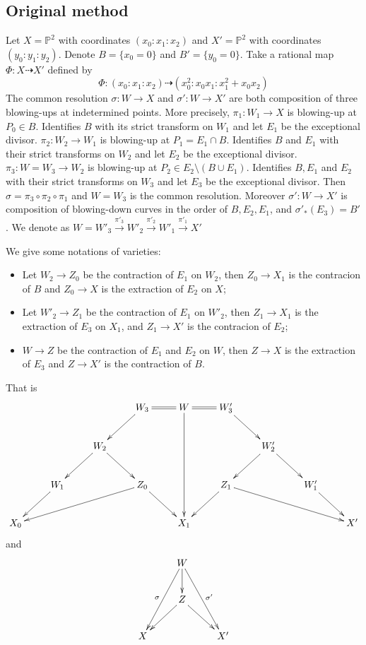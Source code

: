 \documentclass[11pt]{amsart}
\numberwithin{equation}{section}
\begin{document}
\subsection{Original method}\label{example1}
Let $ X=\mathbb{P}^2 $ with coordinates $ (x_0:x_1:x_2) $ and $ X'=\mathbb{P}^2 $ with coordinates $ (y_0:y_1:y_2) $.
Denote $ B=\{x_0=0\} $ and $B'=\{y_{0}=0\} $.
Take a rational map $ \Phi:X\dashrightarrow X' $ defined by 
\[ \Phi:(x_0:x_1:x_2)\dashrightarrow (x_0^2:x_0x_1:x_1^2+x_0x_2) \]
The common resolution $\sigma:W\to X$ and $\sigma':W\to X'$ are both composition of three blowing-ups at indetermined points.
More precisely, $\pi_{1}:W_{1}\to X$ is blowing-up at $P_{0} \in B$. Identifies $B$ with its strict transform on $W_{1}$ and let $E_{1}$ be the exceptional divisor.
$\pi_{2}:W_{2}\to W_{1}$ is blowing-up at $P_{1}=E_{1} \cap B$. Identifies  $B$ and $E_{1}$ with their strict transforms on $W_{2}$ and let $E_{2}$ be the exceptional divisor.
$\pi_{3}:W=W_{3}\to W_{2}$ is blowing-up at $P_{2} \in E_{2} \setminus (B\cup E_{1})$. Identifies  $B, E_{1}$ and $E_{2}$ with their strict transforms   on $W_{3}$ and let $E_{3}$ be the exceptional divisor.
Then $ \sigma=\pi_{3}\circ \pi_{2} \circ \pi_{1} $ and $ W=W_3 $ is the common resolution. Moreover $ \sigma':W\to X' $ is composition of blowing-down curves in the order of $ B,E_2,E_1 $, and $\sigma'_*(E_{3})=B'$. We denote as $W=W'_{3}\xrightarrow{\pi'_{3}} W'_{2}\xrightarrow{\pi'_{2}} W'_{1} \xrightarrow{\pi'_{1}} X'$

We give some notations of varieties:
\begin{itemize}
  \item Let $W_{2}\to Z_{0}$ be the contraction of $E_{1}$ on $W_{2}$, then $Z_{0} \to X_{1}$ is the contracion of $B$  and $Z_{0}\to X$ is the extraction of $E_{2}$ on $X$;
 \item Let $W'_{2}\to Z_{1}$ be the contraction of $E_{1}$ on $W'_{2}$, then $Z_{1} \to X_{1}$ is the extraction of $E_{3}$ on $X_{1}$, and $Z_{1}\to X'$ is the contracion of $E_{2}$;
 \item $W\to Z$ be the contraction of $E_{1}$ and $E_{2}$ on $W$, then $Z\to X$ is the extraction of $E_{3}$ and $Z\to X'$ is the contraction of $B$.
\end{itemize}
That is
    \[ \xymatrix{&&&W_3\ar[ld]\ar@{=}[r]&W\ar[ddd]\ar@{=}[r]&W_3'\ar[rd]\\
      &&W_2\ar[ld]\ar[rd]&&&&W_2'\ar[rd]\ar[dl]\\
      &W_1\ar[ld]&&Z_0\ar[llld]\ar[rd]&&Z_1\ar[ld]\ar[rrrd]&&W_1'\ar[rd]\\
      X_0&&&&X_1&&&&X'
    } \]
    and 
    \[\xymatrix{
      &W\ar[d]\ar[ddl]_{\sigma}\ar[ddr]^{\sigma'}&\\
      &Z\ar[dl]\ar[dr]\\
      X&&X' }  \]
    
\end{document}
